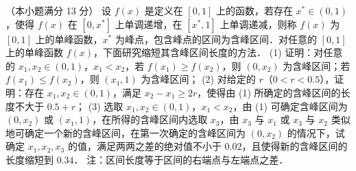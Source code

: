 \begin{question}
（本小题满分 13 分）
设 $f(x)$ 是定义在 $[0, 1]$ 上的函数，若存在 $x^* \in (0, 1)$，使得 $f(x)$ 在 $[0, x^*]$ 上单调递增，在 $[x^*, 1]$ 上单调递减，则称 $f(x)$ 为 $[0, 1]$ 上的单峰函数，$x^*$ 为峰点，包含峰点的区间为含峰区间．对任意的 $[0, 1]$ 上的单峰函数 $f(x)$，下面研究缩短其含峰区间长度的方法．
(1) 证明：对任意的 $x_1, x_2 \in (0, 1)$，$x_1 < x_2$，若 $f(x_1) \geqslant f(x_2)$，则 $(0, x_2)$ 为含峰区间；若 $f(x_1) \leqslant f(x_2)$，则 $(x_1, 1)$ 为含峰区间；
(2) 对给定的 $r$（$0 < r < 0.5$），证明：存在 $x_1, x_2 \in (0, 1)$，满足 $x_2 - x_1 \geqslant 2r$，使得由 (1) 所确定的含峰区间的长度不大于 $0.5 + r$；
(3) 选取 $x_1, x_2 \in (0, 1)$，$x_1 < x_2$，由 (1) 可确定含峰区间为 $(0, x_2)$ 或 $(x_1, 1)$，在所得的含峰区间内选取 $x_3$，由 $x_3$ 与 $x_1$ 或 $x_3$ 与 $x_2$ 类似地可确定一个新的含峰区间，在第一次确定的含峰区间为 $(0, x_2)$ 的情况下，试确定 $x_1, x_2, x_3$ 的值，满足两两之差的绝对值不小于 $0.02$，且使得新的含峰区间的长度缩短到 $0.34$．
注：区间长度等于区间的右端点与左端点之差．

\end{question}